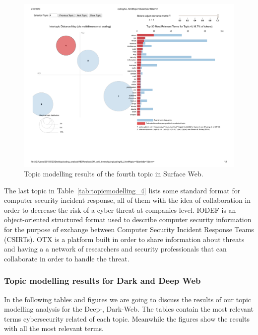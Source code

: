 
\begin{figure}[h!]
\begin{center}
\includegraphics[scale=0.5]{./img/codingALL_topic4.pdf}
\end{center}
\caption{Topic modelling results of the fourth topic in Surface Web.}
\label{fig:topicmodelling_4}
\end{figure}


The last topic in Table~\ref{tab:topicmodelling_4} lists some standard format for computer security incident response, all of them with the idea of collaboration in order to decrease the risk of a cyber threat at companies level. IODEF is an object-oriented structured format used to describe computer security information for the purpose of exchange between Computer Security Incident Response Teams (CSIRTs). OTX is a platform built in order to share information about threats and having a a network of researchers and security professionals that can collaborate in order to handle the threat.


\newpage
\subsubsection{Topic modelling results for Dark and Deep Web}

In the following tables and figures we are going to discuss the results of our topic modelling analysis for the Deep-, Dark-Web. The tables contain the most relevant terms cybersecurity related of each topic. Meanwhile the figures show the results with all the most relevant terms. 

